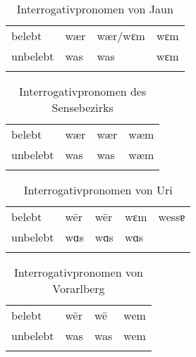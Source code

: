 
\begin{table}[H]
	\caption{Interrogativpronomen von Jaun \citep[285-286]{Stucki1917}}\label{table66}
	\begin{tabular}{llll}
		\lsptoprule
		& \NOM & \AKK & \DAT\\\midrule
 belebt & wær & wær/wɛm & wɛm\\
		unbelebt & was & was & wɛm\\
		\lspbottomrule
	\end{tabular}
\end{table}


\begin{table}[H]
	\caption{Interrogativpronomen des Sensebezirks \citep[201-202]{Henzen1927}}\label{table67}
	\begin{tabular}{llll}
		\lsptoprule
		& \NOM & \AKK & \DAT\\\midrule
 belebt & wær & wær & wæm\\
		unbelebt & was & was & wæm\\
		\lspbottomrule
	\end{tabular}
\end{table}


\begin{table}[H]
	\caption{Interrogativpronomen von Uri \citep[196]{Clauß1929}}\label{table68}
	\begin{tabular}{lllll}
		\lsptoprule
		& \NOM & \AKK & \DAT & \GEN\\\midrule
 belebt & w\=er & w\=er & wɛm & wessɐ\\
		unbelebt & wɑs & wɑs & wɑs & \\
		\lspbottomrule
	\end{tabular}
\end{table}


\begin{table}[H]
	\caption{Interrogativpronomen von Vorarlberg \citep[282]{Jutz1925}}\label{table69}
	\begin{tabular}{llll}
		\lsptoprule
		& \NOM & \AKK & \DAT\\\midrule
 belebt & w\=er & w\=e & wem\\
		unbelebt & was & was & wem\\
		\lspbottomrule
	\end{tabular}
\end{table}

